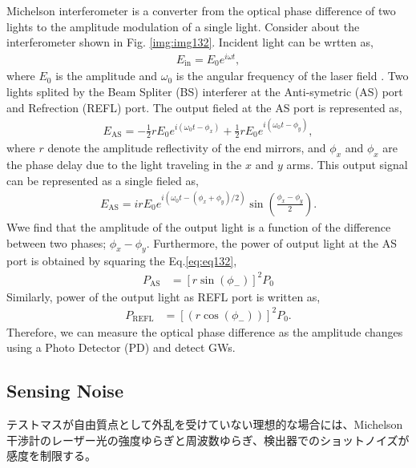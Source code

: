 Michelson interferometer is a converter from the optical phase difference of two lights to the amplitude modulation of a single light. Consider about the interferometer shown in Fig. \ref{img:img132}. Incident light can be wrtten as,
\begin{eqnarray}
  E_{\mathrm{in}} = E_{0} e^{i\omega{t}},
\end{eqnarray}
where $E_0$ is the amplitude and $\omega_0$ is the angular frequency of the laser field
. Two lights splited by the Beam Spliter (BS) interferer at the Anti-symetric (AS) port and Refrection (REFL) port. The output fieled at the AS port is represented as,
\begin{eqnarray}
  E_{\mathrm{AS}} = -\frac{1}{2}rE_{0} e^{i\left(\omega_{0} t-\phi_{x}\right)}+\frac{1}{2}r E_{0} e^{i\left(\omega_{0} t-\phi_{y}\right)},
\end{eqnarray}
where $r$ denote the amplitude reflectivity of the end mirrors, and $\phi_{x}$ and $\phi_{x}$ are the phase delay due to the light traveling in the $x$ and $y$ arms. This output signal can be represented as a single fieled as,
\begin{eqnarray}
E_{\mathrm{AS}} = i r E_{0} e^{i\left(\omega_{0} t-\left(\phi_{x}+\phi_{y}\right) / 2\right)} \sin \left(\frac{\phi_{x}-\phi_{y}}{2}\right). \label{eq:eq132}
\end{eqnarray} 
Wwe find that the amplitude of the output light is a function of the difference between two phases; $\phi_{x}-\phi_{y}$. Furthermore, the power of output light at the AS port is obtained by squaring the Eq.\ref{eq:eq132}, 
\begin{eqnarray}
  P_{\mathrm{AS}} &=\left[r\sin({\phi_{-}})\right]^2P_0  \label{eq:eq133}
\end{eqnarray}
Similarly, power of the output light as REFL port is written as,
\begin{eqnarray}
  P_{\mathrm{REFL}} &=\left[(r\cos({\phi_{-}}))\right]^2P_0. \label{eq:eq134}
\end{eqnarray}
Therefore, we can measure the optical phase difference as the amplitude changes using a Photo Detector (PD) and detect GWs.

\subsection{Sensing Noise}
テストマスが自由質点として外乱を受けていない理想的な場合には、Michelson干渉計のレーザー光の強度ゆらぎと周波数ゆらぎ、検出器でのショットノイズが感度を制限する。

